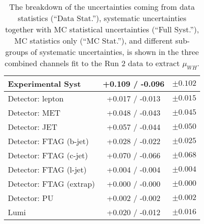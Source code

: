 \begin{table}[h]
\begin{tabular}{|l|c|c|}
Experimental Syst        & +0.109 / -0.096 & $ \pm 0.102 $ \\\hline
Detector: lepton         & +0.017 / -0.013 & $ \pm 0.015 $ \\
Detector: MET            & +0.048 / -0.043 & $ \pm 0.045 $ \\
Detector: JET            & +0.057 / -0.044 & $ \pm 0.050 $ \\
Detector: FTAG (b-jet)   & +0.028 / -0.022 & $ \pm 0.025 $ \\
Detector: FTAG (c-jet)   & +0.070 / -0.066 & $ \pm 0.068 $ \\
Detector: FTAG (l-jet)   & +0.004 / -0.004 & $ \pm 0.004 $ \\
Detector: FTAG (extrap)  & +0.000 / -0.000 & $ \pm 0.000 $ \\
Detector: PU             & +0.002 / -0.002 & $ \pm 0.002 $ \\
Lumi                     & +0.020 / -0.012 & $ \pm 0.016 $ \\
\hline\hline
\end{tabular}
\caption{The breakdown of the uncertainties coming from data statistics (``Data
  Stat.''), systematic uncertainties together with MC statistical uncertainties
  (``Full Syst.''), MC statistics only (``MC Stat.''), and different sub-groups
  of systematic uncertainties, is shown in the three combined channels fit to
  the Run 2 data to extract $\mu_{WH}$.}
 \label{tab:breakdown_012L_MVAWH}
\end{table}

